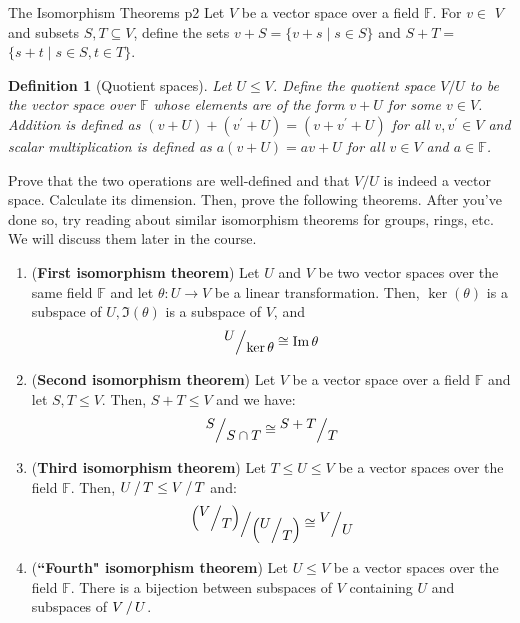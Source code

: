 \documentclass[a4paper, 11pt]{article}
\newtheorem*{definition*}{Definition}
\begin{document}
\begin{problem}{%
		The Isomorphism Theorems
	}{p2%
	}
Let $V$ be a vector space over a field $\mathbb{F}$. For $v \in$ $V$ and subsets $S, T \subseteq V$, define the sets $v+S=\{v+s \mid s \in S\}$ and $S+T=$ $\{s+t \mid s \in S, t \in T\}$.

\begin{definition*}[Quotient spaces]
	 Let $U \leq V$. Define the quotient space $V / U$ to be the vector space over $\mathbb{F}$ whose elements are of the form $v+U$ for some $v \in V$. Addition is defined as $(v+U)+\left(v^{\prime}+U\right)=\left(v+v^{\prime}+U\right)$ for all $v, v^{\prime} \in V$ and scalar multiplication is defined as $a(v+U)=a v+U$ for all $v \in V$ and $a \in \mathbb{F}$.

\end{definition*}
Prove that the two operations are well-defined and that $V / U$ is indeed a vector space. Calculate its dimension. Then, prove the following theorems. After you've done so, try reading about similar isomorphism theorems for groups, rings, etc. We will discuss them later in the course.
\begin{enumerate}[label=(\alph*)]
\item (\textbf{First isomorphism theorem}) Let $U$ and $V$ be two vector spaces over the same field $\mathbb{F}$ and let $\theta: U \rightarrow V$ be a linear transformation. Then, $\ker(\theta)$ is a subspace of $U, \Im(\theta)$ is a subspace of $V$, and
$$
\quotient{U}{\ker \theta} \cong \Im\theta
$$
\item (\textbf{Second isomorphism theorem}) Let $V$ be a vector space over a field $\mathbb{F}$ and let $S, T \leq V$. Then, $S+T \leq V$ and we have:
$$
\quotient{S}{S\cap T}\cong \quotient{S+T}{T}
$$
\item (\textbf{Third isomorphism theorem}) Let $T \leq U \leq V$ be a vector spaces over the field $\mathbb{F}$. Then, $\quotient{U}{T}\leq \quotient{V}{T}$ and:
$$
\quotient{\lt(\quotient{V}{T}\rt)}{\lt(\quotient{U}{T}\rt)}\cong \quotient{V}{U}
$$
\item (\textbf{``Fourth" isomorphism theorem}) Let $U \leq V$ be a vector spaces over the field $\mathbb{F}$. There is a bijection between subspaces of $V$ containing $U$ and subspaces of $\quotient{V}{U}$.
\end{enumerate}
\end{problem}
\end{document}

